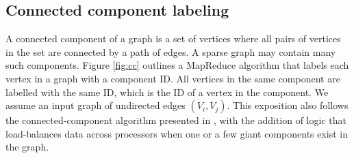 \subsection{Connected component labeling}

A connected component of a graph is a set of vertices where all pairs
of vertices in the set are connected by a path of edges.  A sparse
graph may contain many such components.  Figure \ref{fig:cc} outlines
a MapReduce algorithm that labels each vertex in a graph with a
component ID.  All vertices in the same component are labelled with
the same ID, which is the ID of a vertex in the component.  We assume
an input graph of undirected edges $(V_i,V_j)$.  This exposition also
follows the connected-component algorithm presented in \cite{Cohen},
with the addition of logic that load-balances data across processors
when one or a few giant components exist in the graph.

